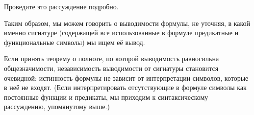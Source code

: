 \begin{problem}
Проведите это рассуждение подробно.
\end{problem}

Таким образом, мы можем говорить о выводимости формулы, не
уточняя, в какой именно сигнатуре (содержащей все использованные
в формуле предикатные и функциональные символы) мы ищем её
вывод.

Если принять теорему о полноте, по которой выводимость
равносильна общезначимости, независимость выводимости от
сигнатуры становится очевидной: истинность формулы не зависит от
интерпретации символов, которые в неё не входят. (Если
интерпретировать отсутствующие в формуле символы как постоянные
функции и предикаты, мы приходим к синтаксическому рассуждению,
упомянутому выше.)
